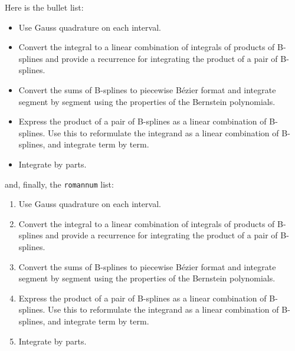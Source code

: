 Here is the bullet list:
\begin{itemize}
\item Use Gauss quadrature on each interval.
\item Convert the integral to a linear combination of
      integrals of products of B-splines and provide a recurrence for
      integrating the product of a pair of B-splines.
\item Convert the sums of B-splines to piecewise
      B\'{e}zier format and integrate segment
      by segment using the properties of the Bernstein polynomials.
\item Express the product of a pair of B-splines as a linear combination
      of B-splines.
      Use this to reformulate the integrand as a linear combination
      of B-splines, and integrate term by term.
\item Integrate by parts.
\end{itemize}
and, finally, the \verb+romannum+ list:
\begin{enumerate}
\item Use Gauss quadrature on each interval.
\item Convert the integral to a linear combination of
      integrals of products of B-splines and provide a recurrence for
      integrating the product of a pair of B-splines.
\item Convert the sums of B-splines to piecewise
      B\'{e}zier format and integrate segment
      by segment using the properties of the Bernstein polynomials.
\item Express the product of a pair of B-splines as a linear combination
      of B-splines.
      Use this to reformulate the integrand as a linear combination
      of B-splines, and integrate term by term.
\item Integrate by parts.
\end{enumerate}


